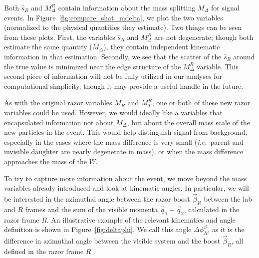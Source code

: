 
Both $\hat{s}_R$ and $M_\Delta^R$ contain information about the mass splitting $M_\Delta$ for signal events. In Figure~\ref{fig:compare_shat_mdelta}, we plot the two variables (normalized to the physical quantities they estimate). Two things can be seen from these plots. First, the variables $\hat{s}_R$ and $M_\Delta^R$ are not degenerate; though both estimate the same quantity ($M_\Delta$), they contain independent kinematic information in that estimation. Secondly, we see that the scatter of the $\hat{s}_R$ around the true value is minimized near the edge structure of the $M_\Delta^R$ variable. This second piece of information will not be fully utilized in our analyses for computational simplicity, though it may provide a useful handle in the future.

As with the original razor variables $M_R$ and $M_T^R$, one or both of these new razor variables could be used. However, we would ideally like a variables that encapsulated information not about $M_\Delta$, but about the overall mass scale of the new particles in the event. This would help distinguish signal from background, especially in the cases where the mass difference is very small ({\it i.e.}~parent and invisible daughter are nearly degenerate in mass), or when the mass difference approaches the mass of the $W$. 

To try to capture more information about the event, we move beyond the mass variables already introduced and look at kinematic angles. In particular, we will be interested in the azimuthal angle between the razor boost $\vec{\beta}_R$ between the lab and $R$ frames and the sum of the visible momenta $\vec{q}_1+\vec{q}_2$, calculated in the razor frame $R$. An illustrative example of the relevant kinematics and angle definition is shown in Figure~\ref{fig:deltaphi}. We call this angle $\Delta \phi_R^{\beta}$, as it is the difference in azimuthal angle between the visible system and the boost $\vec{\beta}_R$, all defined in the razor frame $R$. 

